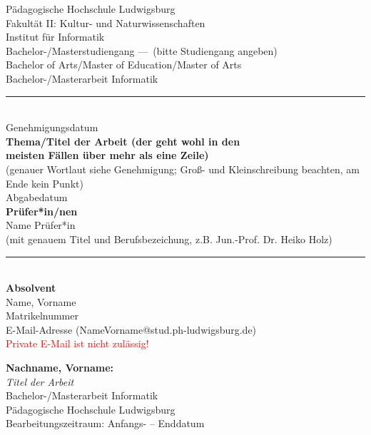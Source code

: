 \documentclass[twoside,12pt,a4paper]{scrreprt} %
\begin{document}
\begin{titlepage}
\begin{center}
\LARGE Pädagogische Hochschule Ludwigsburg \\
\large Fakultät II: Kultur- und Naturwissenschaften \\
Institut für Informatik\\
[1cm]

\Large Bachelor-/Masterstudiengang ---~\small{(bitte Studiengang angeben)}
\\
\Large Bachelor of Arts/Master of Education/Master of Arts
\\[1cm]
\huge Bachelor-/Masterarbeit Informatik
\large\\[0.75cm]
\rule{0.5\textwidth}{1pt}
\\[0.75cm]
\large
Genehmigungsdatum
\\[0.5cm]
\Large\textbf{Thema/Titel der Arbeit (der geht wohl in den\\ meisten Fällen über mehr als eine Zeile)}
\\\small\textrm(genauer Wortlaut siehe Genehmigung; Groß- und Kleinschreibung beachten, am Ende kein Punkt)\\
[0.5cm]
\large
Abgabedatum
\\[1cm]
\small
\textbf{Prüfer*in/nen}\\[0.3cm] 
\large Name Prüfer*in 
\\\small (mit genauem Titel und Berufsbezeichung, z.B. Jun.-Prof. Dr. Heiko Holz)
\\[.75cm]
\rule{0.5\textwidth}{1pt}
\\[0.7  5cm]
\small
\textbf{Absolvent}\\[0.3cm]
\large Name, Vorname\\
Matrikelnummer\\
E-Mail-Adresse \small(NameVorname@stud.ph-ludwigsburg.de)\\\textcolor{red}{Private E-Mail ist nicht zulässig!}
\vfill
{}

\end{center}
\end{titlepage}

\thispagestyle{empty}
\vspace*{\fill}
\textbf{Nachname, Vorname:}\\
\emph{Titel der Arbeit}\\
Bachelor-/Masterarbeit Informatik\\
Pädagogische Hochschule Ludwigsburg\\
Bearbeitungszeitraum: Anfangs- -- Enddatum
\newpage
\end{document}
